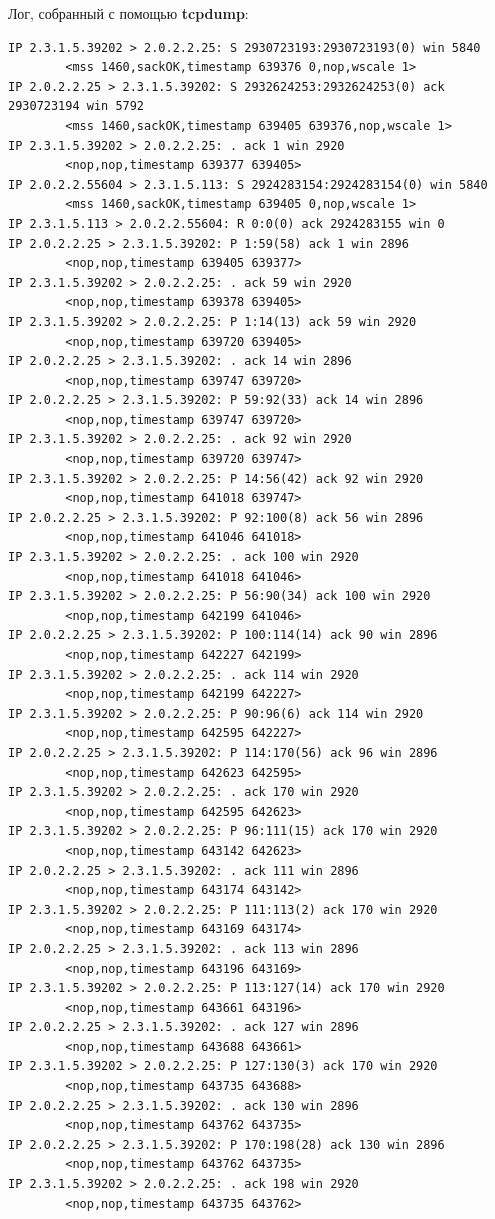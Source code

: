 \documentclass[a4paper,12pt]{article}
\begin{document}
Лог, собранный с помощью \textbf{tcpdump}:
\begin{verbatim}
IP 2.3.1.5.39202 > 2.0.2.2.25: S 2930723193:2930723193(0) win 5840 
		<mss 1460,sackOK,timestamp 639376 0,nop,wscale 1>
IP 2.0.2.2.25 > 2.3.1.5.39202: S 2932624253:2932624253(0) ack 2930723194 win 5792 
		<mss 1460,sackOK,timestamp 639405 639376,nop,wscale 1>
IP 2.3.1.5.39202 > 2.0.2.2.25: . ack 1 win 2920 
		<nop,nop,timestamp 639377 639405>
IP 2.0.2.2.55604 > 2.3.1.5.113: S 2924283154:2924283154(0) win 5840 
		<mss 1460,sackOK,timestamp 639405 0,nop,wscale 1>
IP 2.3.1.5.113 > 2.0.2.2.55604: R 0:0(0) ack 2924283155 win 0
IP 2.0.2.2.25 > 2.3.1.5.39202: P 1:59(58) ack 1 win 2896 
		<nop,nop,timestamp 639405 639377>
IP 2.3.1.5.39202 > 2.0.2.2.25: . ack 59 win 2920 
		<nop,nop,timestamp 639378 639405>
IP 2.3.1.5.39202 > 2.0.2.2.25: P 1:14(13) ack 59 win 2920 
		<nop,nop,timestamp 639720 639405>
IP 2.0.2.2.25 > 2.3.1.5.39202: . ack 14 win 2896 
		<nop,nop,timestamp 639747 639720>
IP 2.0.2.2.25 > 2.3.1.5.39202: P 59:92(33) ack 14 win 2896 
		<nop,nop,timestamp 639747 639720>
IP 2.3.1.5.39202 > 2.0.2.2.25: . ack 92 win 2920 
		<nop,nop,timestamp 639720 639747>
IP 2.3.1.5.39202 > 2.0.2.2.25: P 14:56(42) ack 92 win 2920 
		<nop,nop,timestamp 641018 639747>
IP 2.0.2.2.25 > 2.3.1.5.39202: P 92:100(8) ack 56 win 2896 
		<nop,nop,timestamp 641046 641018>
IP 2.3.1.5.39202 > 2.0.2.2.25: . ack 100 win 2920 
		<nop,nop,timestamp 641018 641046>
IP 2.3.1.5.39202 > 2.0.2.2.25: P 56:90(34) ack 100 win 2920 
		<nop,nop,timestamp 642199 641046>
IP 2.0.2.2.25 > 2.3.1.5.39202: P 100:114(14) ack 90 win 2896 
		<nop,nop,timestamp 642227 642199>
IP 2.3.1.5.39202 > 2.0.2.2.25: . ack 114 win 2920 
		<nop,nop,timestamp 642199 642227>
IP 2.3.1.5.39202 > 2.0.2.2.25: P 90:96(6) ack 114 win 2920 
		<nop,nop,timestamp 642595 642227>
IP 2.0.2.2.25 > 2.3.1.5.39202: P 114:170(56) ack 96 win 2896 
		<nop,nop,timestamp 642623 642595>
IP 2.3.1.5.39202 > 2.0.2.2.25: . ack 170 win 2920 
		<nop,nop,timestamp 642595 642623>
IP 2.3.1.5.39202 > 2.0.2.2.25: P 96:111(15) ack 170 win 2920 
		<nop,nop,timestamp 643142 642623>
IP 2.0.2.2.25 > 2.3.1.5.39202: . ack 111 win 2896 
		<nop,nop,timestamp 643174 643142>
IP 2.3.1.5.39202 > 2.0.2.2.25: P 111:113(2) ack 170 win 2920 
		<nop,nop,timestamp 643169 643174>
IP 2.0.2.2.25 > 2.3.1.5.39202: . ack 113 win 2896 
		<nop,nop,timestamp 643196 643169>
IP 2.3.1.5.39202 > 2.0.2.2.25: P 113:127(14) ack 170 win 2920 
		<nop,nop,timestamp 643661 643196>
IP 2.0.2.2.25 > 2.3.1.5.39202: . ack 127 win 2896 
		<nop,nop,timestamp 643688 643661>
IP 2.3.1.5.39202 > 2.0.2.2.25: P 127:130(3) ack 170 win 2920 
		<nop,nop,timestamp 643735 643688>
IP 2.0.2.2.25 > 2.3.1.5.39202: . ack 130 win 2896 
		<nop,nop,timestamp 643762 643735>
IP 2.0.2.2.25 > 2.3.1.5.39202: P 170:198(28) ack 130 win 2896 
		<nop,nop,timestamp 643762 643735>
IP 2.3.1.5.39202 > 2.0.2.2.25: . ack 198 win 2920 
		<nop,nop,timestamp 643735 643762>
\end{verbatim}
\end{document}
